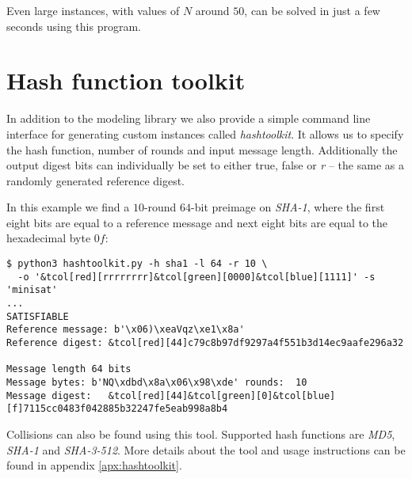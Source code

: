 Even large instances, with values of $N$ around $50$, can be solved in just a few seconds using this program.

\section{Hash function toolkit}
In addition to the modeling library we also provide a simple command line interface for generating custom instances called \emph{hashtoolkit}.
It allows us to specify the hash function, number of rounds and input message length.
Additionally the output digest bits can individually be set to either true, false or \emph{r} -- the same as a randomly generated reference digest.

In this example we find a $10$-round $64$-bit preimage on \emph{SHA-1}, where the first eight bits are equal to a reference message and next eight bits are equal to the hexadecimal byte $0f$:

\newcommand*{\tcol}[2]{\textcolor{#1}{#2}}
\begin{Verbatim}[commandchars=&\[\]]
$ python3 hashtoolkit.py -h sha1 -l 64 -r 10 \
  -o '&tcol[red][rrrrrrrr]&tcol[green][0000]&tcol[blue][1111]' -s 'minisat'
...
SATISFIABLE
Reference message: b'\x06)\xeaVqz\xe1\x8a'
Reference digest: &tcol[red][44]c79c8b97df9297a4f551b3d14ec9aafe296a32

Message length 64 bits
Message bytes: b'NQ\xdbd\x8a\x06\x98\xde' rounds:  10
Message digest:   &tcol[red][44]&tcol[green][0]&tcol[blue][f]7115cc0483f042885b32247fe5eab998a8b4
\end{Verbatim}

Collisions can also be found using this tool.
Supported hash functions are \emph{MD5}, \emph{SHA-1} and \emph{SHA-3-512}.
More details about the tool and usage instructions can be found in appendix \ref{apx:hashtoolkit}.

